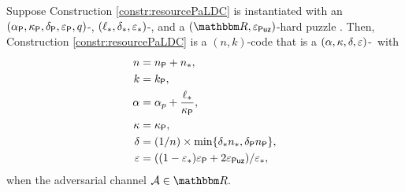 \begin{theorem}
    Suppose Construction \ref{constr:resourcePaLDC} is instantiated with an $(\alpha_{\mathsf{P}},\kappa_{\mathsf{P}},\delta_{\mathsf{P}},\varepsilon_{\mathsf{P}},q)$-\paLDC, $(\ell_*,\delta_*,\varepsilon_*)$-\LDCStar, and a $(\R,\epsPuz)$-hard puzzle \Puz. Then, Construction \ref{constr:resourcePaLDC} is a $(n,k)$-code that is a $\left(\alpha, \kappa, \delta,\varepsilon \right)$-\aLDC\ with 
    \begin{align*}
        n &= n_{\mathsf{P}} + n_{\mathsf{*}},\\
        k &= k_{\mathsf{P}}, \\
        \alpha &= \alpha_p + \frac{\ell_*}{\kappa_{\mathsf{P}}}, \\
        \kappa &= \kappa_{\mathsf{P}},\\
        \delta &= (1/n) \times \min\{\delta_* n_{\mathsf{*}}, \delta_{\mathsf{P}} n_{\mathsf{P}}\}, \\
        \varepsilon &= ((1 - \varepsilon_*) \varepsilon_{\mathsf{P}} + 2 \varepsilon_{\mathsf{Puz}}) /\varepsilon_*,
    \end{align*}
    when the adversarial channel $\calA \in \R.$
\end{theorem}